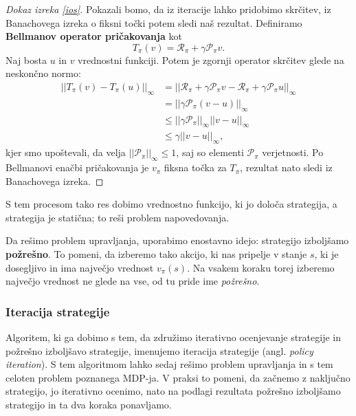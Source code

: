 \documentclass[12pt,a4paper]{amsart}
\theoremstyle{definition} %
\theoremstyle{plain} %
\begin{document}
\begin{proof}[Dokaz izreka \ref{ios}]
    Pokazali bomo, da iz iteracije lahko pridobimo skrčitev, iz Banachovega izreka o fiksni točki 
    potem sledi naš rezultat.
    Definiramo \textbf{Bellmanov operator pričakovanja} kot 
    $$
    T_\pi(v) = \mathcal{R}_\pi + \gamma \mathcal{P}_\pi v.
    $$
    Naj bosta $u$ in $v$ vrednostni funkciji. Potem je zgornji operator skrčitev glede na neskončno 
    normo: 
    \begin{align*}
        ||T_\pi(v) - T_\pi(u)||_\infty &= ||\mathcal{R}_\pi + \gamma \mathcal{P}_\pi v - 
                                            \mathcal{R}_\pi + \gamma \mathcal{P}_\pi u||_\infty \\  
        &= ||\gamma \mathcal{P}_\pi (v - u)||_\infty \\
        &\leq ||\gamma \mathcal{P}_\pi||_\infty ||v - u||_\infty \\
        &\leq \gamma ||v - u||_\infty,
    \end{align*}
    kjer smo upoštevali, da velja $||\mathcal{P}_\pi||_\infty \leq 1$, saj so elementi 
    $\mathcal{P}_\pi$ verjetnosti. Po Bellmanovi enačbi pričakovanja je $v_\pi$ fiksna točka 
    za $T_\pi$, rezultat nato sledi iz Banachovega izreka.
\end{proof}

S tem procesom tako res dobimo vrednostno funkcijo, ki jo določa strategija, a strategija je 
statična; to reši problem napovedovanja. 

Da rešimo problem upravljanja, uporabimo enostavno idejo: strategijo izboljšamo \textbf{požrešno}. 
To pomeni, da izberemo tako akcijo, ki nas pripelje v stanje $s$, ki je dosegljivo in ima največjo 
vrednost $v_\pi(s)$. Na vsakem koraku torej izberemo največjo vrednost ne glede na vse, od tu pride 
ime \textit{požrešno}.

\subsubsection{Iteracija strategije}
Algoritem, ki ga dobimo s tem, da združimo iterativno ocenjevanje strategije in požrešno izboljšavo 
strategije, imenujemo iteracija strategije (angl. \textit{policy iteration}). S tem algoritmom 
lahko sedaj rešimo problem upravljanja in s tem celoten problem poznanega MDP-ja. V praksi to pomeni, 
da začnemo z naključno strategijo, jo iterativno ocenimo, nato na podlagi rezultata požrešno izboljšamo 
strategijo in ta dva koraka ponavljamo.
\end{document}
